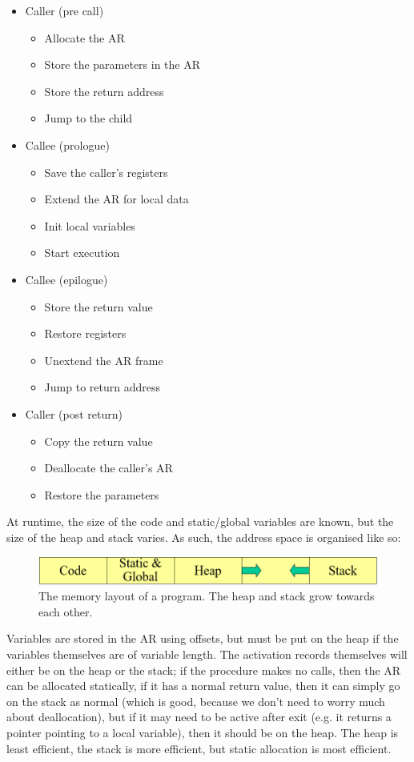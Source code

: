 \begin{itemize}
\item Caller (pre call)
\begin{itemize}
\item Allocate the AR
\item Store the parameters in the AR
\item Store the return address
\item Jump to the child
\end{itemize}
\item Callee (prologue)
\begin{itemize}
\item Save the caller's registers
\item Extend the AR for local data
\item Init local variables
\item Start execution
\end{itemize}
\item Callee (epilogue)
\begin{itemize}
\item Store the return value
\item Restore registers
\item Unextend the AR frame
\item Jump to return address
\end{itemize}
\item Caller (post return)
\begin{itemize}
\item Copy the return value
\item Deallocate the caller's AR
\item Restore the parameters
\end{itemize}
\end{itemize}

At runtime, the size of the code and static/global variables are
known, but the size of the heap and stack varies. As such, the address
space is organised like so:

\begin{figure}[H]
\centering
\includegraphics[width=\textwidth]{diagrams/memory-layout}
\caption{\label{fig:memory-layout}The memory layout of a program. The
heap and stack grow towards each other.}
\end{figure}

Variables are stored in the AR using offsets, but must be put on the
heap if the variables themselves are of variable length. The
activation records themselves will either be on the heap or the stack;
if the procedure makes no calls, then the AR can be allocated
statically, if it has a normal return value, then it can simply go on
the stack as normal (which is good, because we don't need to worry
much about deallocation), but if it may need to be active after exit
(e.g. it returns a pointer pointing to a local variable), then it
should be on the heap. The heap is least efficient, the stack is more
efficient, but static allocation is most efficient.


